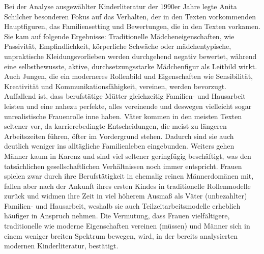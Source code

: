  Bei der Analyse ausgewählter Kinderliteratur der 1990er Jahre legte Anita Schilcher besonderen Fokus auf das Verhalten, der in den Texten vorkommenden Hauptfiguren, das Familiensetting und Bewertungen, die in den Texten vorkamen. Sie kam auf folgende Ergebnisse: Traditionelle Mädcheneigenschaften, wie Passivität, Empfindlichkeit, körperliche Schwäche oder mädchentypische, unpraktische Kleidungsvorlieben werden durchgehend negativ bewertet, während eine selbstbewusste, aktive, durchsetzungsstarke Mädchenfigur als Leitbild wirkt. Auch Jungen, die ein moderneres Rollenbild und Eigenschaften wie Sensibilität, Kreativität und Kommunikationsfähigkeit, vereinen, werden bevorzugt. Auffallend ist, dass berufstätige Mütter gleichzeitig Familien- und Hausarbeit leisten und eine nahezu perfekte, alles vereinende und deswegen vielleicht sogar unrealistische Frauenrolle inne haben. Väter kommen in den meisten Texten seltener vor, da karrierebedingte Entscheidungen, die meist zu längeren Arbeitszeiten führen, öfter im Vordergrund stehen. Dadurch sind sie auch deutlich weniger ins alltägliche Familienleben eingebunden. Weiters gehen Männer kaum in Karenz und sind viel seltener geringfügig beschäftigt, was den tatsächlichen gesellschaftlichen Verhältnissen noch immer entspricht. Frauen spielen zwar durch ihre Berufstätigkeit in ehemalig reinen Männerdomänen mit, fallen aber nach der Ankunft ihres ersten Kindes in traditionelle Rollenmodelle zurück und widmen ihre Zeit in viel höherem Ausmaß als Väter (unbezahlter) Familien- und Hausarbeit, weshalb sie auch Teilzeitarbeitsmodelle  erheblich häufiger in Anspruch nehmen. Die Vermutung, dass Frauen vielfältigere, traditionelle wie moderne Eigenschaften vereinen (müssen) und Männer sich in einem weniger breiten Spektrum bewegen, wird, in der bereits analysierten modernen Kinderliteratur, bestätigt.
        


